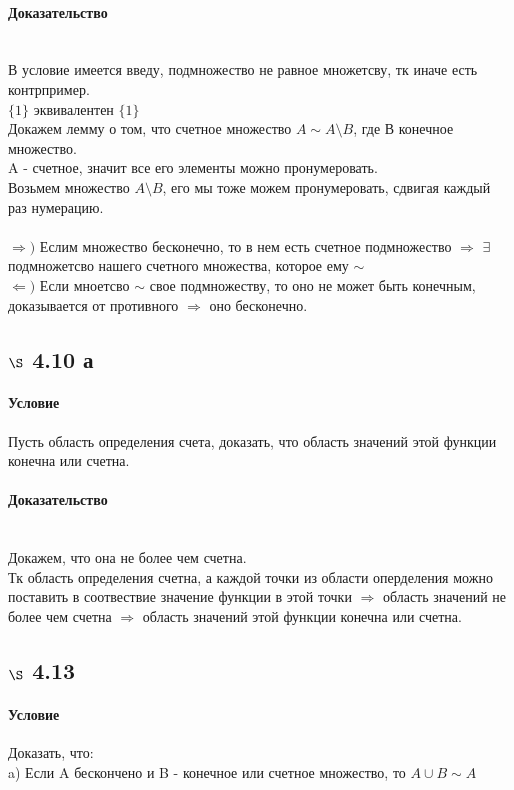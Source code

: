\documentclass[a4paper,12pt]{article}
\begin{document}
\paragraph*{Доказательство}\mbox{}\\
В условие имеется введу, подмножество не равное множетсву, тк иначе есть контрпример.\\
$\{1\}$ эквивалентен $\{1\}$\\
Докажем лемму о том, что счетное множество $ A \sim A \setminus B $, где В конечное множество.\\
A - счетное, значит все его элементы можно пронумеровать. \\
Возьмем множество  $A \setminus B $, его мы тоже можем пронумеровать, сдвигая каждый раз нумерацию.\\
\\
$\Rightarrow ) $ Еслим множество бесконечно, то в нем есть счетное подмножество $\Rightarrow$ $\exists$ подмножетсво нашего счетного множества, которое ему  $ \sim $\\
$\Leftarrow )$ Если мноетсво $ \sim $ свое подмножеству, то оно не может быть конечным, доказывается от противного $\Rightarrow$ оно бесконечно.

\subsection*{$\S$ 4.10 а}
\paragraph*{Условие}
Пусть область определения счета, доказать, что область значений этой функции конечна или счетна. \paragraph*{Доказательство}\mbox{}\\
Докажем, что она не более чем счетна.\\
Тк область определения счетна, а каждой точки из области оперделения можно поставить в соотвествие значение функции в этой точки $\Rightarrow$ область значений не более чем счетна $\Rightarrow$ область значений этой функции конечна или счетна.\\

\subsection*{$\S$ 4.13}
\paragraph*{Условие}
Доказать, что:\\
a) Если A бескончено и B - конечное или счетное множество, то $ A \cup B \sim A$
\end{document}

